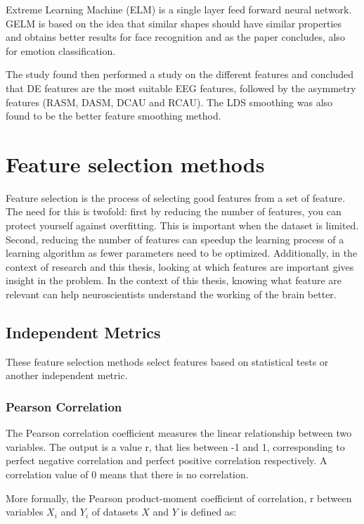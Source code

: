 Extreme Learning Machine (ELM)  is a single layer feed forward neural network\citep{ELMpaper}. GELM is based on the idea that similar shapes should have similar properties and obtains better results for face recognition\citep{GELMpaper} and as the paper concludes, also for emotion classification.

\npar

The study found then performed a study on the different features and concluded that DE features are the most suitable EEG features, followed by the asymmetry features (RASM, DASM, DCAU and RCAU). The LDS smoothing was also found to be the better feature smoothing method. 


\section{Feature selection methods}
Feature selection is the process of selecting good features from a set of feature. The need for this is twofold: first by reducing the number of features, you can protect yourself against overfitting. This is important when the dataset is limited. Second, reducing the number of features can speedup the learning process of a learning algorithm as fewer parameters need to be optimized. Additionally, in the context of research and this thesis, looking at which features are important gives insight in the problem. In the context of this thesis, knowing what feature are relevant can help neuroscientists understand the working of the brain better.

\subsection{Independent Metrics}
These feature selection methods select features based on statistical tests or another independent metric. 

\subsubsection{Pearson Correlation}
The Pearson correlation coefficient measures the linear relationship between two variables. The output is a value r, that lies between -1 and 1, corresponding to perfect negative correlation and perfect positive correlation respectively. A correlation value of 0 means that there is no correlation.

\npar

More formally\citep{corrPaper}, the Pearson product-moment coefficient of correlation, r between variables $X_i$ and $Y_i$ of datasets $X$ and $Y$ is defined as:


